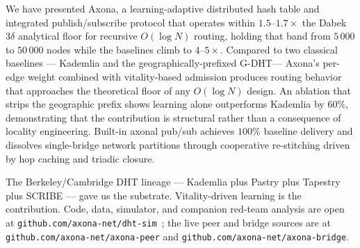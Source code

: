 \documentclass[conference]{IEEEtran}
\newcommand{\axona}{Axona\xspace}
\newcommand{\GDHT}{G-DHT\xspace}
\begin{document}
We have presented \axona, a learning-adaptive distributed hash
table and integrated publish/subscribe protocol that operates
within $1.5$--$1.7\times$ the Dabek $3\delta$ analytical floor
for recursive $O(\log N)$ routing, holding that band from
$5\,000$ to $50\,000$ nodes while the baselines climb to
$4$--$5\times$.
Compared to two classical baselines --- Kademlia and the
geographically-prefixed \GDHT --- \axona's per-edge weight
combined with vitality-based admission produces routing
behavior that approaches the theoretical floor of any
$O(\log N)$ design.  An ablation that strips the geographic
prefix shows learning alone outperforms Kademlia by $60\%$,
demonstrating that the contribution is structural rather than a
consequence of locality engineering.  Built-in axonal pub/sub
achieves $100\%$ baseline delivery and dissolves single-bridge
network partitions through cooperative re-stitching driven by
hop caching and triadic closure.

The Berkeley/Cambridge DHT lineage --- Kademlia plus Pastry
plus Tapestry plus SCRIBE --- gave us the substrate.
Vitality-driven learning is the contribution.  Code, data,
simulator, and companion red-team analysis are open at
\texttt{github.com/axona-net/dht-sim}~\cite{dhtsim2026}; the
live peer and bridge sources are at
\texttt{github.com/axona-net/axona-peer} and
\texttt{github.com/axona-net/axona-bridge}.



\end{document}
